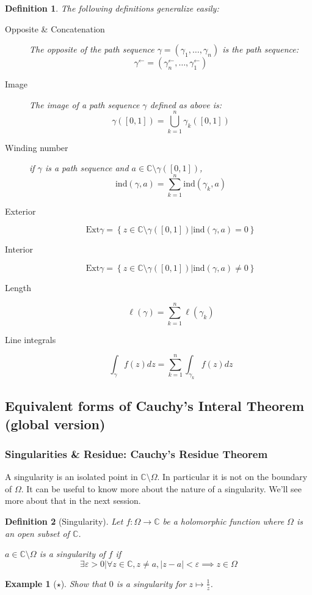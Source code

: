 \documentclass{article}
\newtheorem*{defi}{Definition}
\newtheorem*{example}{Example}
\begin{document}
\begin{defi}
    The following definitions generalize easily:

    \begin{description}
        \item[Opposite \& Concatenation] The opposite of the path sequence $\gamma = (\gamma_1, \dots, \gamma_n)$ is the path sequence:
            $$\gamma^\leftarrow  = (\gamma_n^\leftarrow, \dots, \gamma_1^\leftarrow)$$
        \item[Image] The image of a path sequence $\gamma$ defined as above is:
            $$ \gamma([0,1]) = \bigcup_{k=1}^n{\gamma_k([0,1])} $$
        \item[Winding number] if $\gamma$ is a path sequence and $a\in\mathbb{C}\setminus\gamma([0,1])$,
            $$\mathrm{ind}(\gamma, a) = \sum_{k=1}^n\mathrm{ind}(\gamma_k, a)$$

        \item[Exterior] 
            $$\mathrm{Ext}\gamma = \left\lbrace z\in\mathbb{C}\setminus\gamma([0,1]) \vert \mathrm{ind}(\gamma, a) = 0 \right\rbrace$$
        \item[Interior] 
            $$\mathrm{Ext}\gamma = \left\lbrace z\in\mathbb{C}\setminus\gamma([0,1]) \vert \mathrm{ind}(\gamma, a) \neq 0 \right\rbrace$$
        \item[Length] 
            $$\ell(\gamma) = \sum_{k=1}^n \ell(\gamma_k)$$
        \item[Line integrals]
            $$\int_\gamma f(z)dz = \sum_{k=1}^n \int_{\gamma_k}f(z)dz$$
    \end{description}
\end{defi}

\subsection{Equivalent forms of Cauchy's Interal Theorem (global version)}


\subsubsection{Singularities \& Residue: Cauchy's Residue Theorem}

A singularity is an isolated point in $\mathbb{C}\setminus\Omega$. In particular it is not on the boundary of $\Omega$. It can be useful to know more about the nature of a singularity. We'll see more about that in the next session.

\begin{defi}[Singularity]
    Let $f: \Omega \rightarrow \mathbb{C}$ be a holomorphic function where $\Omega$ is an open subset of $\mathbb{C}$.
    
    $a\in\mathbb{C}\setminus\Omega$ is a singularity of $f$ if
    $$ \exists \varepsilon > 0 \vert \forall z\in\mathbb{C}, z \neq a, |z-a| < \varepsilon \implies z\in\Omega$$
    
\end{defi}
\begin{example}[$\star$]
    Show that $0$ is a singularity for $z \mapsto \frac{1}{z}$.
\end{example}
\end{document}
